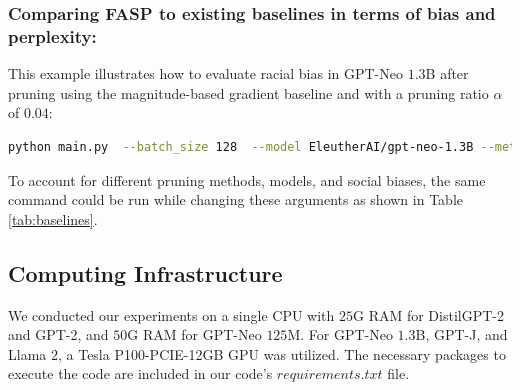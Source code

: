 \documentclass[letterpaper]{article} %
\begin{document}
\subsubsection{Comparing FASP to existing baselines in terms of bias and perplexity:}\label{sec:compute_baselines}

This example  illustrates how to evaluate racial bias in GPT-Neo $1.3$B after pruning using the magnitude-based gradient baseline \cite{NEURIPS2019_2c601ad9} and with a pruning ratio $\alpha$ of $0.04$:
 \begin{lstlisting}[language=bash,numbers=none]
python main.py  --batch_size 128  --model EleutherAI/gpt-neo-1.3B --method mask_gradient_l2_structured --pruned_heads_ratio 0.04 --targeted_holistic_bias race_ethnicity --prompting holistic --seed 1

\end{lstlisting}
To account for different pruning methods, models, and social biases, the same command could be run while changing these arguments as shown in Table \ref{tab:baselines}.







\subsection{Computing Infrastructure}

We conducted our experiments on a single CPU with $25$G RAM for DistilGPT-2 and GPT-2, and $50$G RAM for GPT-Neo $125$M. For GPT-Neo $1.3$B, GPT-J, and Llama $2$, a Tesla P100-PCIE-12GB GPU was utilized. The necessary packages to execute the code are included in our code's $requirements.txt$ file.


\end{document}
